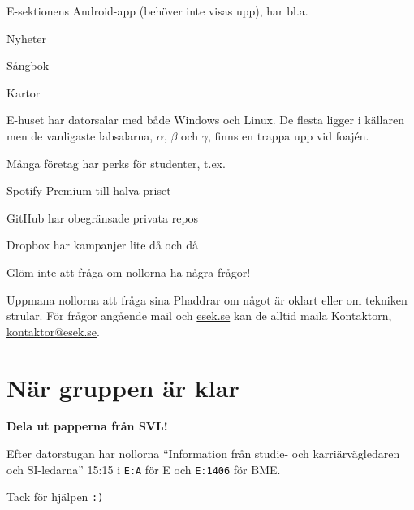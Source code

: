 \documentclass[10pt]{article}
\begin{document}
\begin{dashlist}
		\item E-sektionens Android-app (behöver inte visas upp), har bl.a.
		\begin{dashlist}
			\item Nyheter
			\item Sångbok
			\item Kartor
		\end{dashlist}

		\item E-huset har datorsalar med både Windows och Linux. De flesta ligger i källaren men de vanligaste labsalarna, $\alpha$, $\beta$ och $\gamma$, finns en trappa upp vid foajén.

		\item Många företag har perks för studenter, t.ex.
		\begin{dashlist}
			\item Spotify Premium till halva priset
			\item GitHub har obegränsade privata repos
			\item Dropbox har kampanjer lite då och då
		\end{dashlist}

		\item Glöm inte att fråga om nollorna ha några frågor!

		\item Uppmana nollorna att fråga sina Phaddrar om något är oklart eller om tekniken strular. För frågor angående mail och \url{esek.se} kan de alltid maila Kontaktorn, \url{kontaktor@esek.se}.
	\end{dashlist}

	\section{När gruppen är klar}

	\textbf{Dela ut papperna från SVL!}

	Efter datorstugan har nollorna ``Information från studie- och karriärvägledaren och SI-ledarna'' 15:15 i \texttt{E:A} för E och \texttt{E:1406} för BME.

	Tack för hjälpen \texttt{:)}
\end{document}
